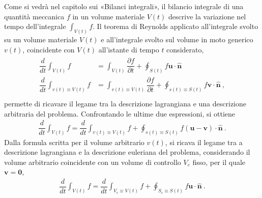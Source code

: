 \documentclass[letterpaper,10pt,italian]{jupyterBook}
\begin{document}
\sphinxAtStartPar
Come si vedrà nel capitolo sui «Bilanci integrali», il bilancio
integrale di una quantità meccanica \(f\) in un volume materiale \(V(t)\)
descrive la variazione nel tempo dell’integrale \(\int_{V(t)} f\). Il
teorema di Reynolds applicato all’integrale svolto su un volume
materiale \(V(t)\) e all’integrale svolto sul volume in moto generico
\(v(t)\), coincidente con \(V(t)\) all’istante di tempo \(t\) considerato,
\begin{equation*}
\begin{split}\begin{aligned}
  \dfrac{d}{d t} \int_{V(t)} f & = \int_{V(t)} \dfrac{\partial f}{\partial t} +
  \oint_{S(t)} f\mathbf{u} \cdot \mathbf{\hat{n}}  \\
  \dfrac{d}{d t} \int_{v(t)\equiv V(t)} f & = \int_{v(t)\equiv V(t)} \dfrac{\partial f}{\partial t} +
  \oint_{s(t)\equiv S(t)} f\mathbf{v} \cdot \mathbf{\hat{n}}  \ , \\
\end{aligned}\end{split}
\end{equation*}
\sphinxAtStartPar
permette di ricavare il legame tra la descrizione
lagrangiana e una descrizione arbitraria del problema. Confrontando le
ultime due espressioni, si ottiene
\begin{equation*}
\begin{split}\dfrac{d}{d t} \int_{V(t)} f = \dfrac{d}{d t} \int_{v(t)\equiv V(t)} f +
 \oint_{s(t)\equiv S(t)} f (\mathbf{u} - \mathbf{v}) \cdot \mathbf{\hat{n}} \ .\end{split}
\end{equation*}
\sphinxAtStartPar
Dalla formula scritta per il volume arbitrario \(v(t)\), si ricava il
legame tra a descrizione lagrangiana e la descrizione euleriana del
problema, considerando il volume arbitrario coincidente con un volume di
controllo \(V_c\) fisso, per il quale \(\mathbf{v}=\mathbf{0}\),
\begin{equation*}
\begin{split}\dfrac{d}{d t} \int_{V(t)} f = \dfrac{d}{d t} \int_{V_c\equiv V(t)} f +
 \oint_{S_c\equiv S(t)} f \mathbf{u} \cdot \mathbf{\hat{n}} \ .\end{split}
\end{equation*}
\end{document}
